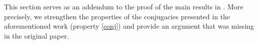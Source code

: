 \documentclass[reqno, a4paper, 10pt]{amsart}
\theoremstyle{plain}
\numberwithin{equation}{section}
\newtheorem{theorem}{Theorem}
\theoremstyle{remark}
\def\R{\mathbb{R}}
\def\Id{\text{\rm Id}}
\def\Z{\mathbb{Z}}
\begin{document}
\appendix

\section{} \label{sec: appendix a}

This section serves as an addendum to the proof of the main results in \cite{DZZ}. More precisely, we strengthen the properties of the conjugacies presented in the aforementioned work (property \eqref{conj}) and provide an argument that was missing in the original paper. 


\end{document}
